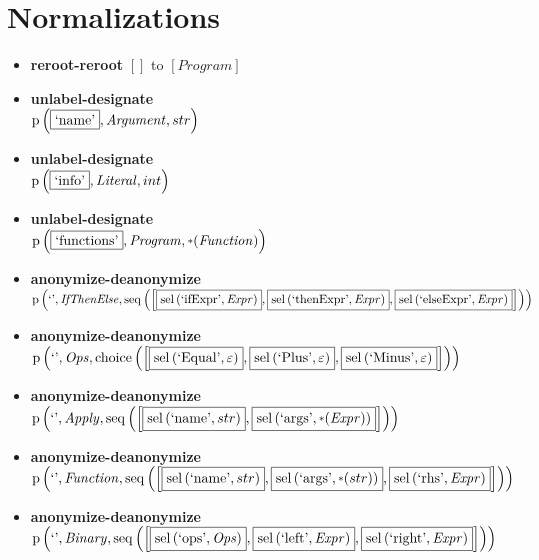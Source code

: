 \section{Normalizations}
{\footnotesize\begin{itemize}
\item \textbf{reroot-reroot} $\left[\right]$ to $\left[\mathit{Program}\right]$
\item \textbf{unlabel-designate}\\$\mathrm{p}\left(\fbox{\text{`name'}},\mathit{Argument},str\right)$
\item \textbf{unlabel-designate}\\$\mathrm{p}\left(\fbox{\text{`info'}},\mathit{Literal},int\right)$
\item \textbf{unlabel-designate}\\$\mathrm{p}\left(\fbox{\text{`functions'}},\mathit{Program},\star \left(\mathit{Function}\right)\right)$
\item \textbf{anonymize-deanonymize}\\$\mathrm{p}\left(\text{`'},\mathit{IfThenElse},\mathrm{seq}\left(\left[\fbox{$\mathrm{sel}\left(\text{`ifExpr'},\mathit{Expr}\right)$}, \fbox{$\mathrm{sel}\left(\text{`thenExpr'},\mathit{Expr}\right)$}, \fbox{$\mathrm{sel}\left(\text{`elseExpr'},\mathit{Expr}\right)$}\right]\right)\right)$
\item \textbf{anonymize-deanonymize}\\$\mathrm{p}\left(\text{`'},\mathit{Ops},\mathrm{choice}\left(\left[\fbox{$\mathrm{sel}\left(\text{`Equal'},\varepsilon\right)$}, \fbox{$\mathrm{sel}\left(\text{`Plus'},\varepsilon\right)$}, \fbox{$\mathrm{sel}\left(\text{`Minus'},\varepsilon\right)$}\right]\right)\right)$
\item \textbf{anonymize-deanonymize}\\$\mathrm{p}\left(\text{`'},\mathit{Apply},\mathrm{seq}\left(\left[\fbox{$\mathrm{sel}\left(\text{`name'},str\right)$}, \fbox{$\mathrm{sel}\left(\text{`args'},\star \left(\mathit{Expr}\right)\right)$}\right]\right)\right)$
\item \textbf{anonymize-deanonymize}\\$\mathrm{p}\left(\text{`'},\mathit{Function},\mathrm{seq}\left(\left[\fbox{$\mathrm{sel}\left(\text{`name'},str\right)$}, \fbox{$\mathrm{sel}\left(\text{`args'},\star \left(str\right)\right)$}, \fbox{$\mathrm{sel}\left(\text{`rhs'},\mathit{Expr}\right)$}\right]\right)\right)$
\item \textbf{anonymize-deanonymize}\\$\mathrm{p}\left(\text{`'},\mathit{Binary},\mathrm{seq}\left(\left[\fbox{$\mathrm{sel}\left(\text{`ops'},\mathit{Ops}\right)$}, \fbox{$\mathrm{sel}\left(\text{`left'},\mathit{Expr}\right)$}, \fbox{$\mathrm{sel}\left(\text{`right'},\mathit{Expr}\right)$}\right]\right)\right)$

\end{itemize}}
